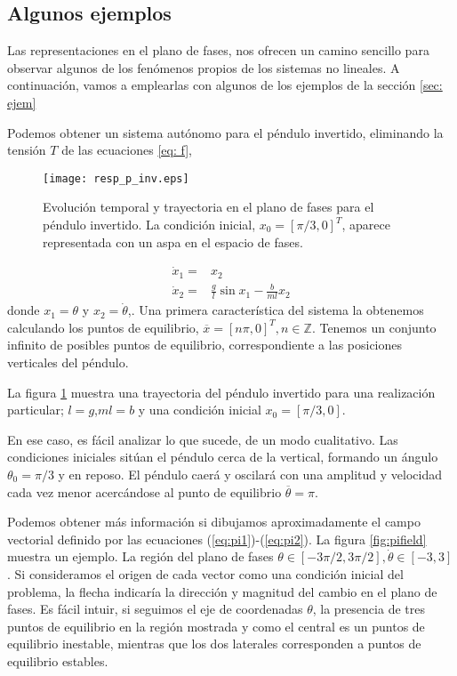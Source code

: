 \subsection{Algunos ejemplos}
Las representaciones en el plano de fases, nos ofrecen un camino sencillo para observar algunos de los fenómenos propios de los sistemas no lineales. A continuación, vamos a emplearlas con algunos de los ejemplos de la sección \ref{sec: ejem}
\begin{example}
Podemos obtener un sistema autónomo para el péndulo invertido, eliminando la tensión $T$ de las ecuaciones \ref{eq: f},
\begin{figure}
\texttt{[image: resp\_p\_inv.eps]}
\caption{Evolución temporal y trayectoria en el plano de fases para el péndulo invertido. La condición inicial, $x_0=[\pi/3,0]^T$, aparece representada con un aspa en el espacio de fases.} \label{fig:trpen}
\end{figure}

\begin{align}
\dot x_1 = &x_2 \label{eq:pi1} \\ 
\dot x_2 = &\frac{g}{l}\sin x_1 - \frac{b}{ml}x_2 \label{eq:pi2}
\end{align}
donde $x_1 = \theta$ y $x_2 = \dot \theta$,. Una primera característica del sistema la obtenemos calculando los puntos de equilibrio, $\overline x=[n\pi,0]^T, n \in \mathbb{Z}$. Tenemos un conjunto infinito de posibles puntos de equilibrio, correspondiente a las posiciones verticales del péndulo.

La figura \ref{fig:trpen} muestra una trayectoria del péndulo invertido para una realización particular; $l=g$,$ml=b$ y una condición inicial $x_0=[\pi/3,0]$. 

En ese caso, es fácil analizar lo que sucede, de un modo cualitativo. Las condiciones iniciales sitúan el péndulo cerca de la vertical, formando un ángulo $\theta_0 =\pi/3$ y en reposo. El péndulo caerá y oscilará con una amplitud y velocidad cada vez menor acercándose al punto de equilibrio $\overline \theta = \pi$.

Podemos obtener más información si dibujamos aproximadamente el campo vectorial definido por las ecuaciones (\ref{eq:pi1})-(\ref{eq:pi2}). La figura \ref{fig:pifield} muestra un ejemplo. La región del plano de fases $\theta \in [-3\pi/2,3\pi/2], \dot \theta \in [-3,3]$. Si consideramos el origen de cada vector como una condición inicial del problema, la flecha indicaría la dirección y magnitud del cambio en el plano de fases.  Es fácil intuir, si seguimos el eje de coordenadas $\theta$, la presencia de tres  puntos de equilibrio en la región mostrada y como el central es un puntos de equilibrio inestable, mientras que los dos laterales corresponden a puntos de equilibrio estables.


\end{example}
